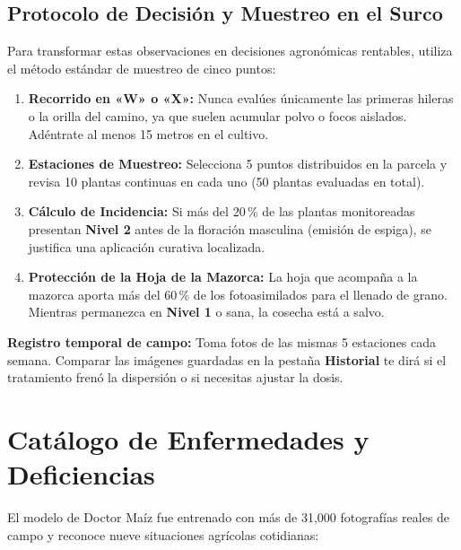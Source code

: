 \documentclass[11pt,a4paper]{report}
\begin{document}
\section{Protocolo de Decisión y Muestreo en el Surco}
Para transformar estas observaciones en decisiones agronómicas rentables, utiliza el método estándar de muestreo de cinco puntos:
\begin{enumerate}[leftmargin=1.4em,itemsep=1.5pt,topsep=2pt,partopsep=0pt,parsep=0pt]
    \item \textbf{Recorrido en «W» o «X»:} Nunca evalúes únicamente las primeras hileras o la orilla del camino, ya que suelen acumular polvo o focos aislados. Adéntrate al menos 15 metros en el cultivo.
    \item \textbf{Estaciones de Muestreo:} Selecciona 5 puntos distribuidos en la parcela y revisa 10 plantas continuas en cada uno (50 plantas evaluadas en total).
    \item \textbf{Cálculo de Incidencia:} Si más del 20\,\% de las plantas monitoreadas presentan \textbf{Nivel 2} antes de la floración masculina (emisión de espiga), se justifica una aplicación curativa localizada.
    \item \textbf{Protección de la Hoja de la Mazorca:} La hoja que acompaña a la mazorca aporta más del 60\,\% de los fotoasimilados para el llenado de grano. Mientras permanezca en \textbf{Nivel 1} o sana, la cosecha está a salvo.
\end{enumerate}

\vspace{1mm}
\begin{campotip}[top=2.5mm,bottom=2.5mm,left=3.5mm,right=3.5mm]
    \textbf{Registro temporal de campo:} Toma fotos de las mismas 5 estaciones cada semana. Comparar las imágenes guardadas en la pestaña \textbf{Historial} te dirá si el tratamiento frenó la dispersión o si necesitas ajustar la dosis.
\end{campotip}

\chapter{Catálogo de Enfermedades y Deficiencias}

El modelo de Doctor Maíz fue entrenado con más de 31,000 fotografías reales de campo y reconoce nueve situaciones agrícolas cotidianas:
\end{document}
